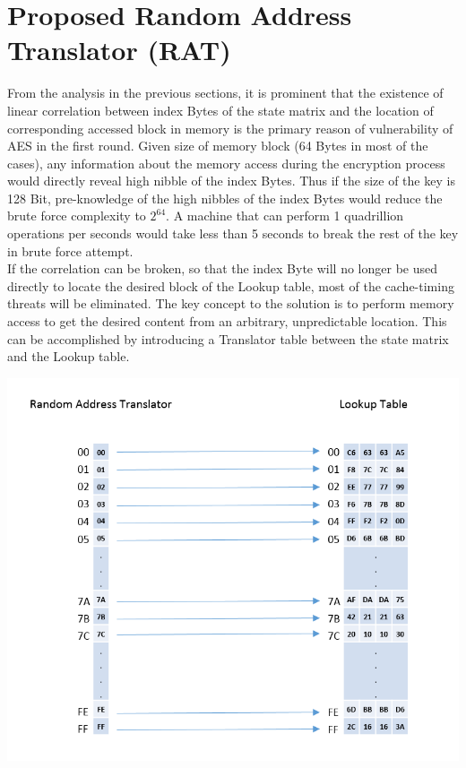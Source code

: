 \documentclass[3p]{elsarticle}
\begin{document}
\section{Proposed Random Address Translator (RAT)}

From the analysis in the previous sections, it is prominent that the existence of linear correlation between index Bytes of the state matrix and the location of corresponding accessed block in memory is the primary reason of vulnerability of AES in the first round. Given size of memory block (64 Bytes in most of the cases), any information about the memory access during the encryption process would directly reveal high nibble of the index Bytes. Thus if the size of the key is 128 Bit, pre-knowledge of the high nibbles of the index Bytes would reduce the brute force complexity to $2^{64}$. A machine that can perform 1 quadrillion operations per seconds would take less than 5 seconds to break the rest of the key in brute force attempt.\\

If the correlation can be broken, so that the index Byte will no longer be used directly to locate the desired block of the Lookup table, most of the cache-timing threats will be eliminated. The key concept to the solution is to perform memory access to get the desired content from an arbitrary, unpredictable location. This can be accomplished by introducing a Translator table between the state matrix and the Lookup table.

\begin{center}
\includegraphics[scale=0.4,natwidth=785,natheight=666]{Figures/rat-init(new).png}
\label{fig: Random Address Translator Initialization.}
\end{center}
\end{document}
